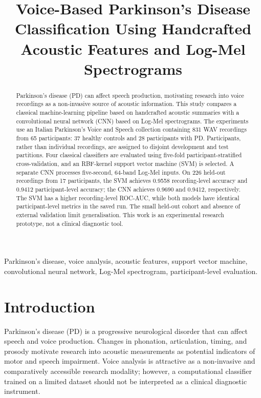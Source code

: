 \documentclass[conference]{IEEEtran}
\title{Voice-Based Parkinson's Disease Classification Using Handcrafted Acoustic Features and Log-Mel Spectrograms}
\author{\IEEEauthorblockN{Suvinay Foujdar, Akshat Goyal, and Navya Loshali}
\IEEEauthorblockA{Department of Computer Science and Engineering\\Bennett University, Greater Noida, India}}
\begin{document}
\maketitle
\begin{abstract}
Parkinson's disease (PD) can affect speech production, motivating research into voice recordings as a non-invasive source of acoustic information. This study compares a classical machine-learning pipeline based on handcrafted acoustic summaries with a convolutional neural network (CNN) based on Log-Mel spectrograms. The experiments use an Italian Parkinson's Voice and Speech collection containing 831 WAV recordings from 65 participants: 37 healthy controls and 28 participants with PD. Participants, rather than individual recordings, are assigned to disjoint development and test partitions. Four classical classifiers are evaluated using five-fold participant-stratified cross-validation, and an RBF-kernel support vector machine (SVM) is selected. A separate CNN processes five-second, 64-band Log-Mel inputs. On 226 held-out recordings from 17 participants, the SVM achieves 0.9558 recording-level accuracy and 0.9412 participant-level accuracy; the CNN achieves 0.9690 and 0.9412, respectively. The SVM has a higher recording-level ROC-AUC, while both models have identical participant-level metrics in the saved run. The small held-out cohort and absence of external validation limit generalisation. This work is an experimental research prototype, not a clinical diagnostic tool.
\end{abstract}
\begin{IEEEkeywords}
Parkinson's disease, voice analysis, acoustic features, support vector machine, convolutional neural network, Log-Mel spectrogram, participant-level evaluation.
\end{IEEEkeywords}

\section{Introduction}
Parkinson's disease (PD) is a progressive neurological disorder that can affect speech and voice production. Changes in phonation, articulation, timing, and prosody motivate research into acoustic measurements as potential indicators of motor and speech impairment. Voice analysis is attractive as a non-invasive and comparatively accessible research modality; however, a computational classifier trained on a limited dataset should not be interpreted as a clinical diagnostic instrument.
\end{document}
